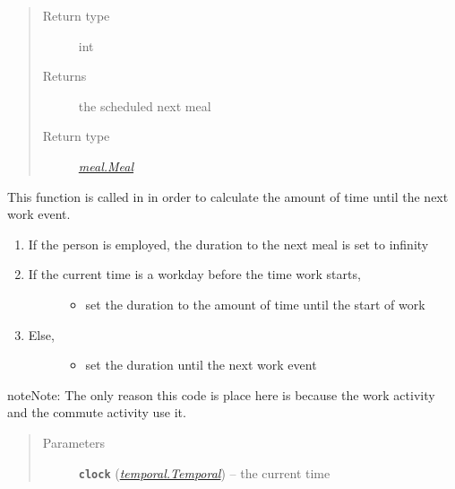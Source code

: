 \documentclass[letterpaper,10pt,english]{sphinxmanual}
\begin{document}
\begin{fulllineitems}
\begin{fulllineitems}
\begin{quote}
\begin{description}
\item[{Return type}] \leavevmode
int

\item[{Returns}] \leavevmode
the scheduled next meal

\item[{Return type}] \leavevmode
{\hyperref[meal:meal.Meal]{\emph{meal.Meal}}}

\end{description}\end{quote}

\end{fulllineitems}


\begin{fulllineitems}
\label{social:social.Social.duration_to_work_event}
This function is called in in order to calculate the amount of time until the next work event.
\begin{enumerate}
\item {} 
If the person is employed, the duration to the next meal is set to infinity

\item {} \begin{description}
\item[{If the current time is a workday before the time work starts,}] \leavevmode\begin{itemize}
\item {} 
set the duration to the amount of time until the start of work

\end{itemize}

\end{description}

\item {} \begin{description}
\item[{Else,}] \leavevmode\begin{itemize}
\item {} 
set the duration until the next work event

\end{itemize}

\end{description}

\end{enumerate}

\begin{notice}{note}{Note:}
The only reason this code is place here is because the work activity and the commute activity use it.
\end{notice}
\begin{quote}\begin{description}
\item[{Parameters}] \leavevmode
\textbf{\texttt{clock}} ({\hyperref[temporal:temporal.Temporal]{\emph{\emph{temporal.Temporal}}}}) -- the current time


\end{description}
\end{quote}
\end{fulllineitems}
\end{fulllineitems}
\end{document}
